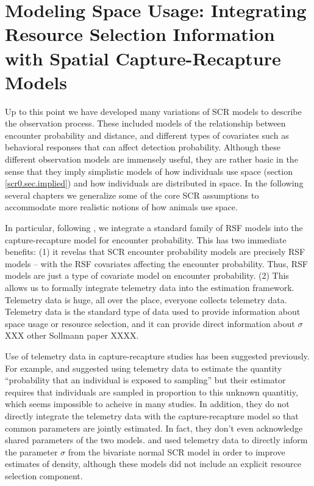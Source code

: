 \chapter{
Modeling Space Usage:
Integrating Resource Selection Information with
Spatial Capture-Recapture
  Models}

\label{chapt.rsf}


\vspace{.3in}

Up to this point we have developed many variations of SCR models to
describe the observation process.  These included models of the
relationship between encounter probability and distance, and different
types of covariates such as behavioral responses that can affect
detection probability.  Although these different observation models
are immensely useful, they are rather basic in the sense that they
imply simplistic models of how individuals use space (section
\ref{scr0.sec.implied}) and how individuals are distributed in space.
In the following several chapters we generalize some of the core SCR
assumptions to accommodate more realistic notions of how animals use
space.  

In particular, following \citet{royle_etal:2012rsf}, 
we integrate a standard family of RSF models
into the capture-recapture model for encounter probability.  This has
two immediate benefits: (1) it revelas that SCR encounter probability
models are precisely RSF models -- with the RSF covariates affecting
the encounter probability. Thus, RSF models are just a type of
covariate model on encounter probability. (2) This allows us to
formally integrate telemetry data into the estimation
framework. Telemetry data is huge, all over the place, everyone
collects telemetry data. Telemetry data is the standard type of data
used to provide information about
space usage or resource selection, and it can provide direct
information about $\sigma$ \citep{sollmann_etal:2012ecol} XXX other
Sollmann paper XXXX. 


Use of telemetry data in capture-recapture studies has been suggested
previously. For example, \citet{white_shenk:2001} and
\citet{ivan:2012} suggested using telemetry data to estimate the
quantity ``probability that an individual is exposed to sampling'' but
their estimator requires that individuals are sampled in proportion to
this unknown quantitiy, which seems impossible to acheive in many
studies. In addition, they do not directly integrate the telemetry
data with the capture-recapture model so that common parameters are
jointly estimated. In fact, they don't even acknowledge shared
parameters of the two models.  \citet{sollmann_etal:inprep} and \citet{sollmann_etal:2012ecol}
 used telemetry data to directly inform
the
parameter $\sigma$ from the bivariate normal SCR model in order to
improve estimates of density, although 
these models did not include
an explicit resource selection component.



